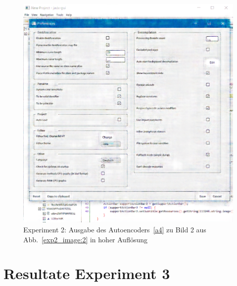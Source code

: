 \begin{figure} [ht]
  \centering
  \includegraphics[width=\textwidth]{bilder/result_exp2/1_pred_a4.png}

  \caption{Experiment 2: Ausgabe des Autoencoders~\ref{a4} zu Bild 2 aus Abb.~\ref{exp2_image:2} in hoher Auflösung}
\end{figure}

\section{Resultate Experiment 3}
\label{sec:appendix:exp3}

